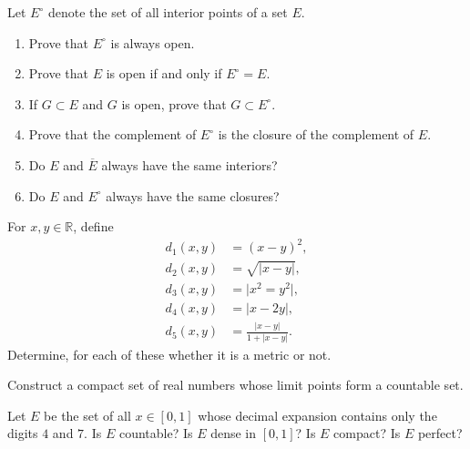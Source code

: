 \documentclass[12 pt, letterpaper]{hmcpset}
\begin{document}
\begin{problem}
	Let $E^{\circ}$ denote the set of all interior points of a set $E$.
	\begin{enumerate}
		\item Prove that $E^{\circ}$ is always open.
		\item Prove that $E$ is open if and only if $E^{\circ} = E$.
		\item If $G \subset E$ and $G$ is open, prove that $G \subset E^{\circ}$.
		\item Prove that the complement of $E^{\circ}$ is the closure of the complement of $E$.
		\item Do $E$ and $\overline{E}$ always have the same interiors?
		\item Do $E$ and $E^{\circ}$ always have the same closures?
	\end{enumerate}
\end{problem}

\pagebreak

\begin{problem}
	For $x, y \in \mathbb{R}$, define
	\[
		\begin{split}
			d_{1}(x, y) & = (x - y)^{2}, \\
			d_{2}(x, y) & = \sqrt{\lvert x - y \rvert}, \\
			d_{3}(x, y) & = \lvert x^{2} = y^{2} \rvert, \\
			d_{4}(x, y) & = \lvert x - 2y \rvert, \\
			d_{5}(x, y) & = \frac{\lvert x - y \rvert}{1 + \lvert x - y \rvert}.
		\end{split}
	\]
	Determine, for each of these whether it is a metric or not.
\end{problem}

\pagebreak

\begin{problem}
	Construct a compact set of real numbers whose limit points form a countable set.
\end{problem}

\pagebreak

\begin{problem}
	Let $E$ be the set of all $x \in [0, 1]$ whose decimal expansion contains only the digits $4$ and $7$. Is $E$ countable? Is $E$ dense in $[0, 1]$? Is $E$ compact? Is $E$ perfect?
\end{problem}

\pagebreak
\end{document}
